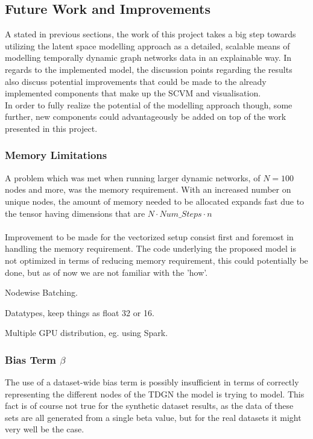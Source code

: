\subsection{Future Work and Improvements}
\label{sec:Discussion:FutureWork}
A stated in previous sections, the work of this project takes a big step towards utilizing the latent space modelling approach as a detailed, scalable means of modelling temporally dynamic graph networks data in an explainable way.
In regards to the implemented model, the discussion points regarding the results also discuss potential improvements that could be made to the already implemented components that make up the SCVM and visualisation. 
\\
In order to fully realize the potential of the modelling approach though, some further, new components could advantageously be added on top of the work presented in this project.


\subsubsection{Memory Limitations}
\label{sec:Discussion:FutureWork:MemoryLimitations}
A problem which was met when running larger dynamic networks, of $N = 100$ nodes and more, was the memory requirement.
With an increased number on unique nodes, the amount of memory needed to be allocated expands fast due to the tensor having dimensions that are $N \cdot Num\_Steps \cdot n$
\\\\
Improvement to be made for the vectorized setup consist first and foremost in handling the memory requirement. 
The code underlying the proposed model is not optimized in terms of reducing memory requirement, this could potentially be done, but as of now we are not familiar with the 'how'.

Nodewise Batching.

Datatypes, keep things as float 32 or 16.

Multiple GPU distribution, eg. using Spark.


\subsubsection{Bias Term $\beta$}
\label{sec:Discussion:Results:BiasTerm}
The use of a dataset-wide bias term is possibly insufficient in terms of correctly representing the different nodes of the TDGN the model is trying to model. 
This fact is of course not true for the synthetic dataset results, as the data of these sets are all generated from a single beta value, but for the real datasets it might very well be the case.

